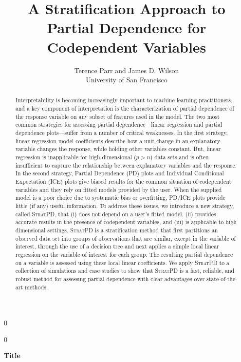 \documentclass[12pt]{article}
\newcommand{\blind}{0}
\newcommand{\spd}{\fontfamily{cmr}\textsc{\small StratPD}}
\begin{document}
\def\spacingset#1{\renewcommand{\baselinestretch}%
{#1}\small\normalsize} \spacingset{1}



\blind
{
  \title{\bf A Stratification Approach to Partial Dependence for Codependent Variables}

  \author{Terence Parr and James D. Wilson\\
      University of San Francisco\\
}
  \maketitle
} \fi

\blind
{
  \bigskip
  \bigskip
  \bigskip
  \begin{center}
    {\LARGE\bf Title}
\end{center}
  \medskip
} \fi

\bigskip
\begin{abstract}
Interpretability is becoming increasingly important to machine learning practitioners, and a key component of  interpretation is the characterization of partial dependence of the response variable on any subset of features used in the model. The two most common strategies for assessing partial dependence---linear regression and partial dependence plots---suffer from a number of critical weaknesses. In the first strategy, linear regression model coefficients describe how a unit change in an explanatory variable changes the response, while holding other variables constant. But, linear regression is inapplicable for high dimensional ($p>n$) data sets and is often insufficient to capture the relationship between explanatory variables and the response.  In the second strategy, Partial Dependence (PD) plots and Individual Conditional Expectation (ICE) plots give biased results for the common situation of codependent variables and they rely on fitted models provided by the user. When the supplied model is a poor choice due to systematic bias or overfitting, PD/ICE plots provide little (if any) useful information. To address these issues, we introduce a new strategy, called \spd{}, that (i) does not depend on a user's fitted model, (ii) provides accurate results in the presence of codependent variables, and (iii) is applicable to high dimensional settings. \spd{} is a stratification method that first partitions an observed data set into groups of observations that are similar, except in the variable of interest, through the use of a decision tree and next applies a simple local linear regression on the variable of interest for each group. The resulting partial dependence on a variable is assessed using these local linear coefficients. We apply \spd{} to a collection of simulations and case studies to show that \spd{} is a fast, reliable, and robust method for assessing partial dependence with clear advantages over state-of-the-art methods. 
\end{abstract}
\end{document}
